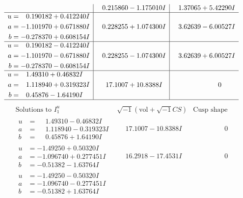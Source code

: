\documentclass[1p]{elsarticle_modified}
\theoremstyle{definition}
\newcommand{\I}{\sqrt{-1}}
\begin{document}
$$\begin{array}{c|c|c}
 & \phantom{-}0.215860 - 1.175010 I & \phantom{-}1.37065 + 5.42290 I \\ \hline\begin{aligned}
u &= \phantom{-}0.190182 + 0.412240 I \\
a &= -1.101970 + 0.671880 I \\
b &= -0.278370 + 0.608154 I\end{aligned}
 & \phantom{-}0.228255 + 1.074300 I & \phantom{-}3.62639 - 6.00527 I \\ \hline\begin{aligned}
u &= \phantom{-}0.190182 - 0.412240 I \\
a &= -1.101970 - 0.671880 I \\
b &= -0.278370 - 0.608154 I\end{aligned}
 & \phantom{-}0.228255 - 1.074300 I & \phantom{-}3.62639 + 6.00527 I \\ \hline\begin{aligned}
u &= \phantom{-}1.49310 + 0.46832 I \\
a &= \phantom{-}1.118940 + 0.319323 I \\
b &= \phantom{-}0.45876 - 1.64190 I\end{aligned}
 & \phantom{-}17.1007 + 10.8388 I & \phantom{-0.000000 } 0\\
 \hline 
 \end{array}$$\newpage$$\begin{array}{c|c|c}  
\text{Solutions to }I^u_{1}& \I (\text{vol} + \sqrt{-1}CS) & \text{Cusp shape}\\
 \hline 
\begin{aligned}
u &= \phantom{-}1.49310 - 0.46832 I \\
a &= \phantom{-}1.118940 - 0.319323 I \\
b &= \phantom{-}0.45876 + 1.64190 I\end{aligned}
 & \phantom{-}17.1007 - 10.8388 I & \phantom{-0.000000 } 0 \\ \hline\begin{aligned}
u &= -1.49250 + 0.50320 I \\
a &= -1.096740 + 0.277451 I \\
b &= -0.51382 - 1.63764 I\end{aligned}
 & \phantom{-}16.2918 - 17.4531 I & \phantom{-0.000000 } 0 \\ \hline\begin{aligned}
u &= -1.49250 - 0.50320 I \\
a &= -1.096740 - 0.277451 I \\
b &= -0.51382 + 1.63764 I\end{aligned}

\end{array}$$
\end{document}
